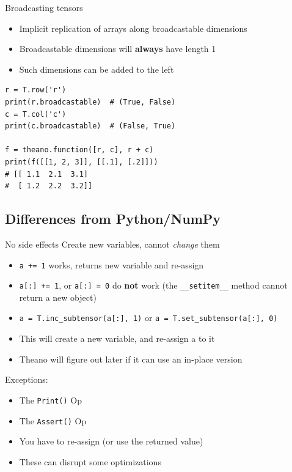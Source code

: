 \documentclass[a4paper,9pt]{beamer}
\begin{document}
\begin{frame}[fragile]{Broadcasting tensors}
  \begin{itemize}
    \item Implicit replication of arrays along broadcastable dimensions
    \item Broadcastable dimensions will {\bf always} have length 1
    \item Such dimensions can be added to the left
  \end{itemize}
  \begin{verbatim}
r = T.row('r')
print(r.broadcastable)  # (True, False)
c = T.col('c')
print(c.broadcastable)  # (False, True)

f = theano.function([r, c], r + c)
print(f([[1, 2, 3]], [[.1], [.2]]))
# [[ 1.1  2.1  3.1]
#  [ 1.2  2.2  3.2]]
  \end{verbatim}
\end{frame}

\subsection{Differences from Python/NumPy}
\begin{frame}[fragile]{No side effects}
  Create new variables, cannot \emph{change} them
  \begin{itemize}
    \item \verb|a += 1| works, returns new variable and re-assign
    \item \verb|a[:] += 1|, or \verb|a[:] = 0| do \textbf{not} work
      (the \verb|__setitem__| method cannot return a new object)
    \item \verb|a = T.inc_subtensor(a[:], 1)| or \verb|a = T.set_subtensor(a[:], 0)|
    \item This will create a new variable, and re-assign a to it
    \item Theano will figure out later if it can use an in-place version
  \end{itemize}
  Exceptions:
  \begin{itemize}
    \item The \verb|Print()| Op
    \item The \verb|Assert()| Op
    \item You have to re-assign (or use the returned value)
    \item These can disrupt some optimizations
  \end{itemize}
\end{frame}
\end{document}
